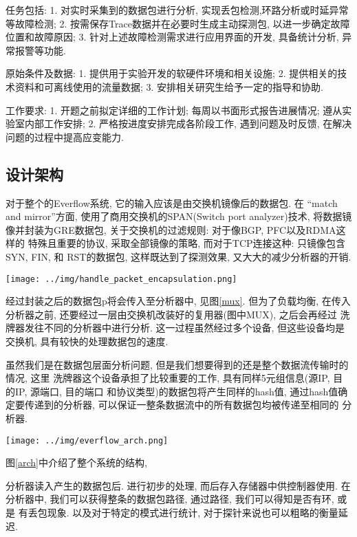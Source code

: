 {\begin{mdframed}[everyline=true]
任务包括: 1. 对实时采集到的数据包进行分析,
实现丢包检测,环路分析或时延异常等故障检测; 2.
按需保存Trace数据并在必要时生成主动探测包,
以进一步确定故障位置和故障原因; 3.
针对上述故障检测需求进行应用界面的开发, 具备统计分析, 异常报警等功能.

原始条件及数据: 1. 提供用于实验开发的软硬件环境和相关设施; 2.
提供相关的技术资料和可离线使用的流量数据; 3.
安排相关研究生给予一定的指导和协助.

工作要求: 1. 开题之前拟定详细的工作计划; 每周以书面形式报告进展情况;
遵从实验室内部工作安排; 2. 严格按进度安排完成各阶段工作,
遇到问题及时反馈, 在解决问题的过程中提高应变能力.

\subsection{设计架构}

对于整个的Everflow系统, 它的输入应该是由交换机镜像后的数据包. 在 ``match
and mirror''方面, 使用了商用交换机的SPAN(Switch port analyzer)技术,
将数据镜像并封装为GRE数据包, 关于交换机的过滤规则: 对于像BGP,
PFC以及RDMA这样的 特殊且重要的协议, 采取全部镜像的策略,
而对于TCP连接这种: 只镜像包含SYN, FIN, 和 RST的数据包,
这样既达到了探测效果, 又大大的减少分析器的开销.

\begin{center}
    \texttt{[image: ../img/handle\_packet\_encapsulation.png]}
    \label{mux}
\end{center}

经过封装之后的数据包p将会传入至分析器中, 见图\ref{mux}. 但为了负载均衡,
在传入分析器之前, 还要经过一层由交换机改装好的复用器(图中MUX),
之后会再经过 洗牌器发往不同的分析器中进行分析. 这一过程虽然经过多个设备,
但这些设备均是交换机, 具有较快的处理数据包的速度.

虽然我们是在数据包层面分析问题,
但是我们想要得到的还是整个数据流传输时的情况, 这里
洗牌器这个设备承担了比较重要的工作, 具有同样5元组信息(源IP, 目的IP,
源端口, 目的端口 和协议类型)的数据包将产生同样的hash值,
通过hash值确定要传递到的分析器,
可以保证一整条数据流中的所有数据包均被传递至相同的 分析器.

\begin{center}
    \texttt{[image: ../img/everflow\_arch.png]}
    \label{arch}
\end{center}

图\ref{arch}中介绍了整个系统的结构,

分析器读入产生的数据包后. 进行初步的处理, 而后存入存储器中供控制器使用.
在分析器中, 我们可以获得整条的数据包路径, 通过路径,
我们可以得知是否有环, 或是 有丢包现象. 以及对于特定的模式进行统计,
对于探针来说也可以粗略的衡量延迟.


\end{mdframed}}
